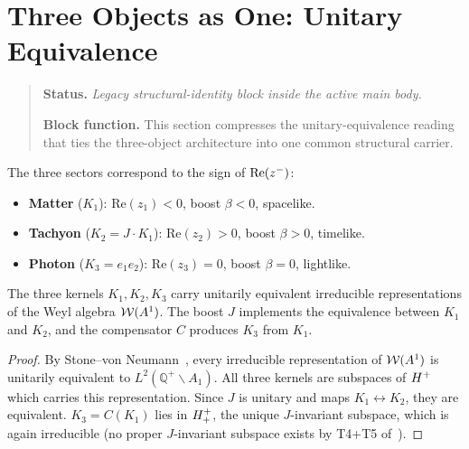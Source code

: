 \section{Three Objects as One: Unitary Equivalence}
\begin{quote}\small
\noindent\textbf{Status.} \emph{Legacy structural-identity block inside the active main body.}\par
\noindent\textbf{Block function.} This section compresses the unitary-equivalence reading that ties the three-object architecture into one common structural carrier.
\end{quote}
\label{sec:unitary}

\begin{definition}
The three sectors correspond to the sign of $\mathrm{Re}(z^-)$:
\begin{itemize}
  \item \textbf{Matter} ($K_1$): $\mathrm{Re}(z_1)<0$, boost $\beta<0$, spacelike.
  \item \textbf{Tachyon} ($K_2=J\cdot K_1$): $\mathrm{Re}(z_2)>0$, boost $\beta>0$, timelike.
  \item \textbf{Photon} ($K_3=e_1 e_2$): $\mathrm{Re}(z_3)=0$, boost $\beta=0$, lightlike.
\end{itemize}
\end{definition}

\begin{theorem}\label{thm:unitary-equiv}
The three kernels $K_1,K_2,K_3$ carry unitarily equivalent
irreducible representations of the Weyl algebra $\mathcal{W}(A^1)$.
The boost $J$ implements the equivalence between $K_1$ and $K_2$,
and the compensator $C$ produces $K_3$ from $K_1$.
\end{theorem}

\begin{proof}
By Stone--von Neumann~\cite{brendecke2026rh}, every irreducible
representation of $\mathcal{W}(A^1)$ is unitarily equivalent to $L^2(\mathbb{Q}^+\backslash A_1)$.
All three kernels are subspaces of $H^+$ which carries this
representation.
Since $J$ is unitary and maps $K_1\leftrightarrow K_2$, they are
equivalent.
$K_3=C(K_1)$ lies in $H^+_+$, the unique $J$-invariant subspace,
which is again irreducible (no proper $J$-invariant subspace exists by
T4+T5 of~\cite{brendecke2026rh}).
\end{proof}


